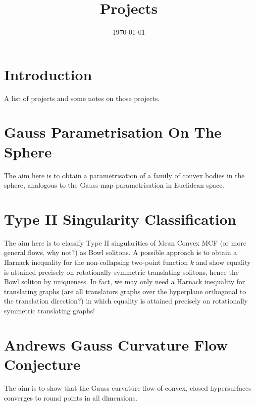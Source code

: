 \documentclass{amsart}
\begin{document}
\title{Projects}

\curraddr{}
\email{}
\date{\today}

\dedicatory{}
\subjclass[2010]{}
\keywords{}

\begin{abstract}
\end{abstract}

\maketitle

\section{Introduction}

A list of projects and some notes on those projects.

\section{Gauss Parametrisation On The Sphere}

The aim here is to obtain a parametrisation of a family of convex bodies in the sphere, analogous to the Gauss-map parametrisation in Euclidean space.

\section{Type II Singularity Classification}

The aim here is to classify Type II singularities of Mean Convex MCF (or more general flows, why not?) as Bowl solitons. A possible approach is to obtain a Harnack inequality for the non-collapsing two-point function $k$ and show equality is attained precisely on rotationally symmetric translating solitons, hence the Bowl soliton by uniqueness. In fact, we may only need a Harnack inequality for translating graphs (are all translators graphs over the hyperplane orthogonal to the translation direction?) in which equality is attained precisely on rotationally symmetric translating graphs!

\section{Andrews Gauss Curvature Flow Conjecture}

The aim is to show that the Gauss curvature flow of convex, closed hypersurfaces converges to round points in all dimensions.
\end{document}
